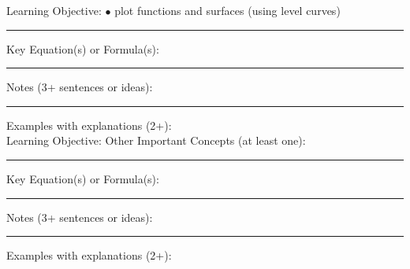 \documentclass{article}
\theoremstyle{plain}
\theoremstyle{definition}
\theoremstyle{remark}
\begin{document}
\newpage
\noindent \large Learning Objective:
\normalsize
\vskip0.15in
\indent $\bullet$ plot functions and surfaces (using level curves)
\vskip0.15in
\hrule
\vspace{0.1in}
\large \noindent Key Equation(s) or Formula(s):
\normalsize

\vspace{1in}
\hrule
\vspace{0.1in}
\large \noindent Notes (3+ sentences or ideas):
\normalsize
\vspace{1.75in}
\hrule
\vspace{0.1in}

\large \noindent Examples with explanations (2+):\\



\newpage
\noindent \large Learning Objective:
\normalsize
\vskip0.1in
\noindent Other Important Concepts (at least one):
\vspace{0.75in}
\hrule
\vspace{0.1in}
\large \noindent Key Equation(s) or Formula(s):
\normalsize

\vspace{1.25in}
\hrule
\vspace{0.1in}
\large \noindent Notes (3+ sentences or ideas):
\normalsize
\vspace{1.75in}
\hrule
\vspace{0.1in}

\large \noindent Examples with explanations (2+):
\end{document}
